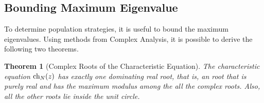 \documentclass[11pt,reqno]{amsart}
\numberwithin{equation}{section}
\theoremstyle{plain}
\newtheorem{theorem}[thm]{Theorem}
\newcommand{\ch}{\textnormal{ch}}
\begin{document}
\subsection{Bounding Maximum Eigenvalue}
To determine population strategies, it is useful to bound the maximum eigenvalues. 
Using methods from Complex Analysis, it is possible to derive the following 
two theorems. 

\begin{theorem}[Complex Roots of the Characteristic Equation]\label{thm:compRoots}
    The characteristic equation $\ch_N(z)$ has exactly one dominating 
    real root, that is, an root that is purely real and has the maximum modulus among the all the complex roots. Also, all the other roots lie inside the unit circle. 
\end{theorem}
\end{document}

